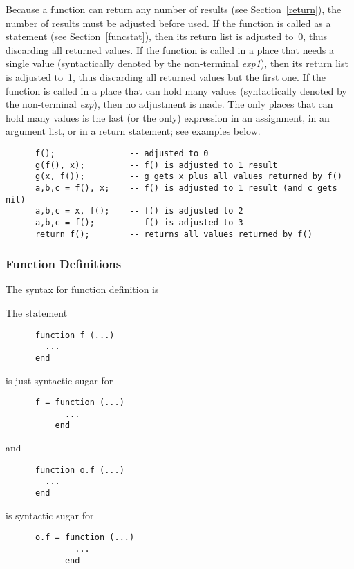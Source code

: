 \documentclass[11pt]{article}
\newcommand{\See}[1]{Section~\ref{#1}}
\newcommand{\see}[1]{(see \See{#1})}
\newcommand{\M}[1]{\emph{#1}}
\newcommand{\Index}[1]{#1\index{#1}}
\begin{document}
Because a function can return any number of results
\see{return},
the number of results must be adjusted before used.
If the function is called as a statement \see{funcstat},
then its return list is adjusted to~0,
thus discarding all returned values.
If the function is called in a place that needs a single value
(syntactically denoted by the non-terminal \M{exp1}),
then its return list is adjusted to~1,
thus discarding all returned values but the first one.
If the function is called in a place that can hold many values
(syntactically denoted by the non-terminal \M{exp}),
then no adjustment is made.
The only places that can hold many values
is the last (or the only) expression in an assignment,
in an argument list, or in a return statement;
see examples below.
\begin{verbatim}
      f();               -- adjusted to 0
      g(f(), x);         -- f() is adjusted to 1 result
      g(x, f());         -- g gets x plus all values returned by f()
      a,b,c = f(), x;    -- f() is adjusted to 1 result (and c gets nil)
      a,b,c = x, f();    -- f() is adjusted to 2
      a,b,c = f();       -- f() is adjusted to 3
      return f();        -- returns all values returned by f()
\end{verbatim}

\subsubsection{\Index{Function Definitions}} \label{func-def}

The syntax for function definition is
\begin{Produc}
\end{Produc}
The statement
\begin{verbatim}
      function f (...)
        ...
      end
\end{verbatim}
is just syntactic sugar for
\begin{verbatim}
      f = function (...)
            ...
          end
\end{verbatim}
and
\begin{verbatim}
      function o.f (...)
        ...
      end
\end{verbatim}
is syntactic sugar for
\begin{verbatim}
      o.f = function (...)
              ...
            end
\end{verbatim}
\end{document}

